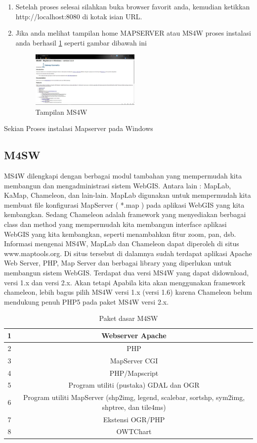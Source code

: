 \begin{enumerate}
\begin{figure}[ht]
		\end{figure}
\item
Setelah proses selesai silahkan buka browser favorit anda, kemudian ketikkan http://localhost:8080 di kotak isian URL.
\item
Jika anda melihat tampilan home MAPSERVER atau MS4W proses instalasi anda berhasil \ref{gambar4} seperti gambar dibawah ini
\begin{figure}[ht]
	    \centerline{\includegraphics[width=0.50\textwidth]{figures/gambar4.JPG}}
	    \caption{Tampilan MS4W}
		\label{gambar4}
		\end{figure}
\end{enumerate}
Sekian Proses instalasi Mapserver pada Windows

\subsection{M4SW}
MS4W dilengkapi dengan berbagai modul tambahan yang mempermudah kita membangun dan mengadministrasi sistem WebGIS. Antara lain : MapLab, KaMap, Chameleon, dan lain-lain. MapLab digunakan untuk mempermudah kita membuat file konfigurasi MapServer ( *.map ) pada aplikasi WebGIS yang kita kembangkan. Sedang Chameleon adalah framework yang menyediakan berbagai class dan method yang mempermudah kita membangun interface aplikasi WebGIS yang kita kembangkan, seperti menambahkan fitur zoom, pan, dsb. Informasi mengenai MS4W, MapLab dan Chameleon dapat diperoleh di situs www.maptools.org. Di situs tersebut di dalamnya sudah terdapat aplikasi Apache Web Server, PHP, Map Server dan berbagai library yang diperlukan untuk membangun sistem WebGIS. Terdapat dua versi MS4W yang dapat didownload, versi 1.x dan versi 2.x. Akan tetapi Apabila kita akan menggunakan framework chameleon, lebih bagus pilih MS4W versi 1.x (versi 1.6) karena Chameleon belum mendukung penuh PHP5 pada paket MS4W versi 2.x.

\begin{table}[h]
\caption{Paket dasar M4SW}
\centering
\begin{tabular}{cc}
\hline
1&Webserver Apache\\
\hline
2&PHP\\
\hline
3&MapServer CGI\\
\hline
4&PHP/Mapscript\\
\hline
5&Program utiliti (pustaka) GDAL dan OGR\\
\hline
6&Program utiliti MapServer (shp2img, legend, scalebar, sortshp, sym2img, shptree, dan tile4ms)\\
\hline
7&Ekstensi OGR/PHP\\
\hline
8&OWTChart\\
\hline
\end{tabular}
\end{table}
